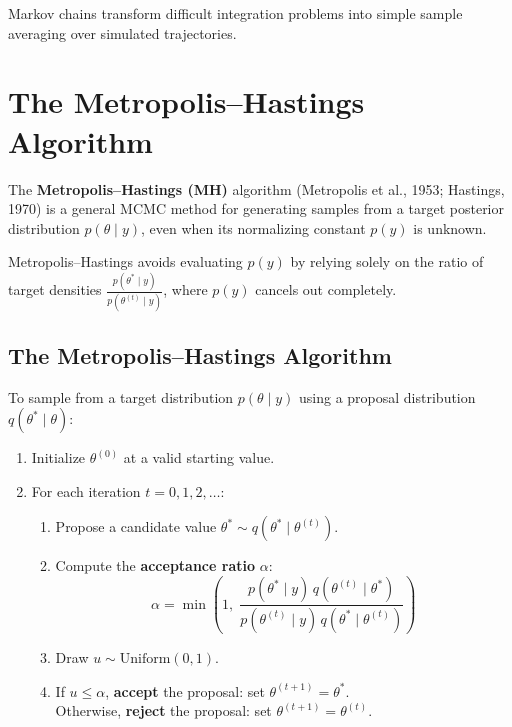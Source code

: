 \documentclass[12pt,a4paper]{article}
\begin{document}
\begin{keyidea}
Markov chains transform difficult integration problems into simple sample averaging over simulated trajectories.
\end{keyidea}

\newpage

\section{The Metropolis--Hastings Algorithm}

The \textbf{Metropolis--Hastings (MH)} algorithm (Metropolis et al., 1953; Hastings, 1970) is a general MCMC method for generating samples from a target posterior distribution $p(\theta \mid y)$, even when its normalizing constant $p(y)$ is unknown.

\begin{keyidea}
Metropolis--Hastings avoids evaluating $p(y)$ by relying solely on the ratio of target densities $\frac{p(\theta^* \mid y)}{p(\theta^{(t)} \mid y)}$, where $p(y)$ cancels out completely.
\end{keyidea}

\subsection{The Metropolis--Hastings Algorithm}

\begin{defbox}
To sample from a target distribution $p(\theta \mid y)$ using a proposal distribution $q(\theta^* \mid \theta)$:
\begin{enumerate}[leftmargin=1.5em]
    \item Initialize $\theta^{(0)}$ at a valid starting value.
    \item For each iteration $t = 0, 1, 2, \ldots$:
    \begin{enumerate}[label=\alph*.]
        \item Propose a candidate value $\theta^* \sim q(\theta^* \mid \theta^{(t)})$.
        \item Compute the \textbf{acceptance ratio} $\alpha$:
        \[
        \alpha = \min\left(1, \; \frac{p(\theta^* \mid y) \, q(\theta^{(t)} \mid \theta^*)}{p(\theta^{(t)} \mid y) \, q(\theta^* \mid \theta^{(t)})}\right)
        \]
        \item Draw $u \sim \text{Uniform}(0,1)$.
        \item If $u \le \alpha$, \textbf{accept} the proposal: set $\theta^{(t+1)} = \theta^*$. \\
        Otherwise, \textbf{reject} the proposal: set $\theta^{(t+1)} = \theta^{(t)}$.
    \end{enumerate}
\end{enumerate}
\end{defbox}
\end{document}
